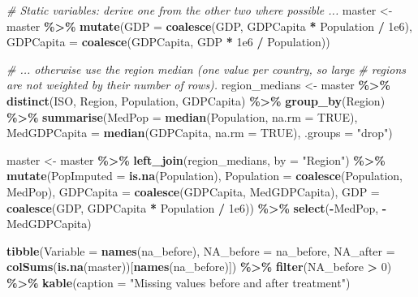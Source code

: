 \documentclass[
]{article}
\newenvironment{Shaded}{\begin{snugshade}}{\end{snugshade}}
\newcommand{\AttributeTok}[1]{\textcolor[rgb]{0.13,0.29,0.53}{#1}}
\newcommand{\CommentTok}[1]{\textcolor[rgb]{0.56,0.35,0.01}{\textit{#1}}}
\newcommand{\ConstantTok}[1]{\textcolor[rgb]{0.56,0.35,0.01}{#1}}
\newcommand{\DecValTok}[1]{\textcolor[rgb]{0.00,0.00,0.81}{#1}}
\newcommand{\FloatTok}[1]{\textcolor[rgb]{0.00,0.00,0.81}{#1}}
\newcommand{\FunctionTok}[1]{\textcolor[rgb]{0.13,0.29,0.53}{\textbf{#1}}}
\newcommand{\NormalTok}[1]{#1}
\newcommand{\OtherTok}[1]{\textcolor[rgb]{0.56,0.35,0.01}{#1}}
\newcommand{\SpecialCharTok}[1]{\textcolor[rgb]{0.81,0.36,0.00}{\textbf{#1}}}
\newcommand{\StringTok}[1]{\textcolor[rgb]{0.31,0.60,0.02}{#1}}
\begin{document}
\begin{Shaded}
\begin{Highlighting}[]
\CommentTok{\# Static variables: derive one from the other two where possible ...}
\NormalTok{master }\OtherTok{\textless{}{-}}\NormalTok{ master }\SpecialCharTok{\%\textgreater{}\%}
  \FunctionTok{mutate}\NormalTok{(}\AttributeTok{GDP =} \FunctionTok{coalesce}\NormalTok{(GDP, GDPCapita }\SpecialCharTok{*}\NormalTok{ Population }\SpecialCharTok{/} \FloatTok{1e6}\NormalTok{),}
         \AttributeTok{GDPCapita =} \FunctionTok{coalesce}\NormalTok{(GDPCapita, GDP }\SpecialCharTok{*} \FloatTok{1e6} \SpecialCharTok{/}\NormalTok{ Population))}

\CommentTok{\# ... otherwise use the region median (one value per country, so large}
\CommentTok{\# regions are not weighted by their number of rows).}
\NormalTok{region\_medians }\OtherTok{\textless{}{-}}\NormalTok{ master }\SpecialCharTok{\%\textgreater{}\%}
  \FunctionTok{distinct}\NormalTok{(ISO, Region, Population, GDPCapita) }\SpecialCharTok{\%\textgreater{}\%}
  \FunctionTok{group\_by}\NormalTok{(Region) }\SpecialCharTok{\%\textgreater{}\%}
  \FunctionTok{summarise}\NormalTok{(}\AttributeTok{MedPop =} \FunctionTok{median}\NormalTok{(Population, }\AttributeTok{na.rm =} \ConstantTok{TRUE}\NormalTok{),}
            \AttributeTok{MedGDPCapita =} \FunctionTok{median}\NormalTok{(GDPCapita, }\AttributeTok{na.rm =} \ConstantTok{TRUE}\NormalTok{),}
            \AttributeTok{.groups =} \StringTok{"drop"}\NormalTok{)}

\NormalTok{master }\OtherTok{\textless{}{-}}\NormalTok{ master }\SpecialCharTok{\%\textgreater{}\%}
  \FunctionTok{left\_join}\NormalTok{(region\_medians, }\AttributeTok{by =} \StringTok{"Region"}\NormalTok{) }\SpecialCharTok{\%\textgreater{}\%}
  \FunctionTok{mutate}\NormalTok{(}\AttributeTok{PopImputed =} \FunctionTok{is.na}\NormalTok{(Population),}
         \AttributeTok{Population =} \FunctionTok{coalesce}\NormalTok{(Population, MedPop),}
         \AttributeTok{GDPCapita =} \FunctionTok{coalesce}\NormalTok{(GDPCapita, MedGDPCapita),}
         \AttributeTok{GDP =} \FunctionTok{coalesce}\NormalTok{(GDP, GDPCapita }\SpecialCharTok{*}\NormalTok{ Population }\SpecialCharTok{/} \FloatTok{1e6}\NormalTok{)) }\SpecialCharTok{\%\textgreater{}\%}
  \FunctionTok{select}\NormalTok{(}\SpecialCharTok{{-}}\NormalTok{MedPop, }\SpecialCharTok{{-}}\NormalTok{MedGDPCapita)}

\FunctionTok{tibble}\NormalTok{(}\AttributeTok{Variable =} \FunctionTok{names}\NormalTok{(na\_before),}
       \AttributeTok{NA\_before =}\NormalTok{ na\_before,}
       \AttributeTok{NA\_after =} \FunctionTok{colSums}\NormalTok{(}\FunctionTok{is.na}\NormalTok{(master))[}\FunctionTok{names}\NormalTok{(na\_before)]) }\SpecialCharTok{\%\textgreater{}\%}
  \FunctionTok{filter}\NormalTok{(NA\_before }\SpecialCharTok{\textgreater{}} \DecValTok{0}\NormalTok{) }\SpecialCharTok{\%\textgreater{}\%}
  \FunctionTok{kable}\NormalTok{(}\AttributeTok{caption =} \StringTok{"Missing values before and after treatment"}\NormalTok{)}
\end{Highlighting}
\end{Shaded}
\end{document}
